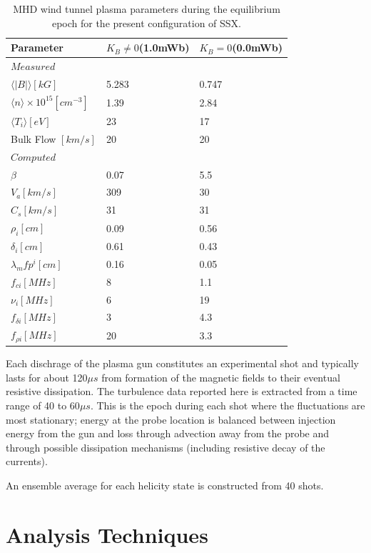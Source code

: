 \documentclass[aip,prl,amsmath,amssymb,reprint,superscriptaddress]{revtex4-1} %
\begin{document}
\begin{table}
\caption{\label{tab:params}MHD wind tunnel plasma parameters during the equilibrium epoch for the present configuration of SSX.}
\begin{tabular}{|l|l|l|}
\hline
Parameter&$K_{B}\neq 0$(1.0mWb)&$K_{B}=0$(0.0mWb)\\
\hline
$Measured$&&\\
\hline
$\langle |B|\rangle [kG]$&5.283&0.747\\
$\langle n\rangle \times 10^{15} [cm^{-3}]$&1.39&2.84\\
$\langle T_{i}\rangle [eV]$&23&17\\
Bulk Flow $[km/s]$&20&20\\
\hline
$Computed$&&\\
\hline
$\beta$&0.07&5.5\\
$V_{a} [km/s]$&309&30\\
$C_{s} [km/s]$&31&31\\
$\rho_{i} [cm]$&0.09&0.56\\
$\delta_{i} [cm]$&0.61&0.43\\
$\lambda_mfp^{i} [cm]$&0.16&0.05\\
$f_{ci} [MHz]$&8&1.1\\
$\nu_{i} [MHz]$&6&19\\
$f_{\delta i} [MHz]$&3&4.3\\
$f_{\rho i} [MHz]$&20&3.3\\
\hline
\end{tabular}
\end{table}

Each dischrage of the plasma gun constitutes an experimental shot and typically lasts for about 120$\mu s$ from formation of the magnetic fields to their eventual resistive dissipation. The turbulence data reported here is extracted from a time range of 40 to 60$\mu s$. This is the epoch during each shot where the fluctuations are most stationary; energy at the probe location is balanced between injection energy from the gun and loss through advection away from the probe and through possible dissipation mechanisms (including resistive decay of the currents).

An ensemble average for each helicity state is constructed from 40 shots.

\section{Analysis Techniques}\label{sec:analysis}
\end{document}
